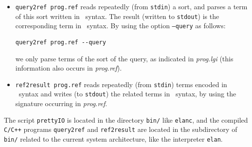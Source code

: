 \begin{itemize}

\item \texttt{query2ref prog.ref} reads repeatedly (from
\texttt{stdin}) a sort, and parses a term of this sort written in 
\elan\ syntax. The result (written to \texttt{stdout}) 
is the corresponding term in \REF\ syntax.
By using the option \texttt{--query} as follows: 
\begin{verbatim}
query2ref prog.ref --query
\end{verbatim}
we only parse terms of the sort of the query, as indicated in
\textit{prog.lgi} (this information also occurs in \textit{prog.ref}).

\item \texttt{ref2result prog.ref} reads repeatedly (from \texttt{stdin})
terms encoded  in \REF\ syntax and writes (to \texttt{stdout}) 
the related terms in \elan\ syntax, by using the signature 
occurring in \textit{prog.ref}.

\end{itemize}

The script \texttt{prettyIO} is located in the directory \texttt{bin/}
like \texttt{elanc}, and the compiled \texttt{C/C++} programs
\texttt{query2ref} and \texttt{ref2result} are located in the
subdirectory of \texttt{bin/} related to the current system
architecture, like the interpreter \texttt{elan}.




